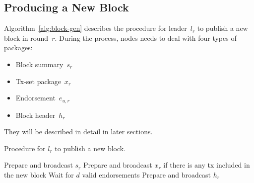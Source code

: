 \documentclass{article}
\begin{document}
\begin{longtable}{p{3cm} p{10cm}}
\end{longtable}

\subsection{Producing a New Block}

Algorithm~\ref{alg:block-gen} describes the procedure for leader~$l_r$ to publish a new block in round~$r$. During the process, nodes needs to deal with four types of packages: 
\begin{itemize}
    \item Block summary~$s_r$
    \item Tx-set package~$x_r$
    \item Endorsement~$e_{u,r}$
    \item Block header~$h_r$
\end{itemize}
They will be described in detail in later sections.

\begin{algorithm}[H]
\caption{Procedure for $l_r$ to publish a new block.}
\label{alg:block-gen}
\begin{spacing}{1.2}
\begin{algorithmic}[1]
    \vspace{1ex}
    \State Prepare and broadcast $s_r$
    \State Prepare and broadcast $x_r$ if there is any tx included in the new block
    \State Wait for $d$ valid endorsements 
    \State Prepare and broadcast $h_r$
\end{algorithmic}
\end{spacing}
\end{algorithm}
\end{document}
